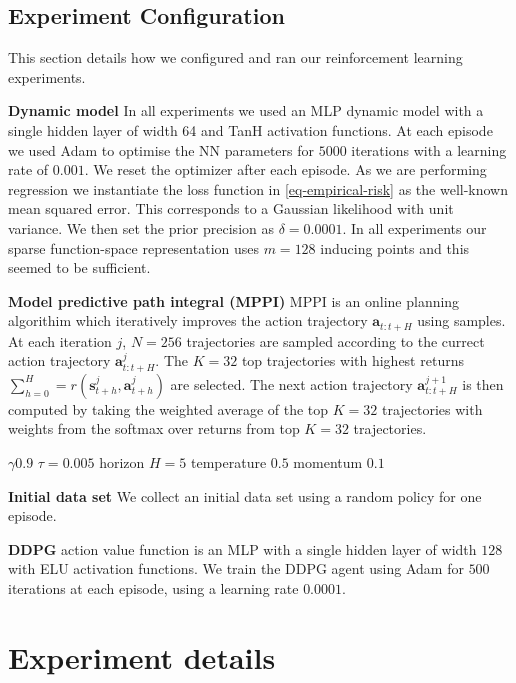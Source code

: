 \documentclass{article}
\newcommand{\state}{\ensuremath{\mathbf{s}}}
\newcommand{\action}{\ensuremath{\mathbf{a}}}
\begin{document}
\subsection{Experiment Configuration}
This section details how we configured and ran our reinforcement learning experiments.

\textbf{Dynamic model}
In all experiments we used an MLP dynamic model with a single hidden layer of width 64 and TanH activation functions.
At each episode we used Adam \cite{adam} to optimise the NN parameters for $5000$ iterations with a learning rate of $0.001$.
We reset the optimizer after each episode.
As we are performing regression we instantiate the loss function in \cref{eq-empirical-risk} as the well-known mean squared error.
This corresponds to a Gaussian likelihood with unit variance.
We then set the prior precision as $\delta=0.0001$.
In all experiments our sparse function-space representation uses $m=128$ inducing points and this seemed to be sufficient.



\textbf{Model predictive path integral (MPPI)}
MPPI is an online planning algorithim which iteratively improves the action trajectory $\action_{t:t+H}$ using samples.
At each iteration $j$, $N=256$ trajectories are sampled according to the currect action trajectory $\action^{j}_{t:t+H}$.
The $K=32$ top trajectories with highest returns $\sum_{h=0}^{H} = r(\state^{j}_{t+h}, \action^{j}_{t+h})$ are selected.
The next action trajectory $\action^{j+1}_{t:t+H}$ is then computed by taking the weighted average of the top $K=32$ trajectories
with weights from the softmax over returns from top $K=32$ trajectories.

$\gamma 0.9$
$\tau=0.005$
horizon $H=5$
temperature $0.5$
momentum $0.1$

\textbf{Initial data set}
We collect an initial data set using a random policy for one episode.

\textbf{DDPG}
action value function is an MLP with a single hidden layer of width $128$ with ELU activation functions.
We train the DDPG agent using Adam for $500$ iterations at each episode, using a learning rate $0.0001$.




\section{Experiment details}
\label{app:experiments}
\end{document}
